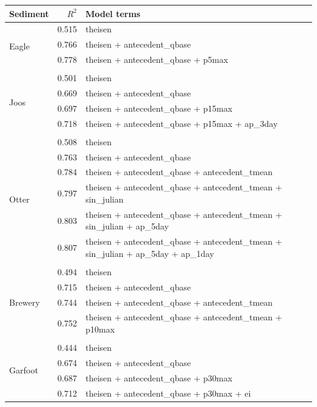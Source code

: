 \documentclass[10pt]{article}
\begin{document}
\begin{table}[h] \small
    \begin{center}
    \begin{tabular}{lrl}
    \textbf{Sediment} & $R^2$ & Model terms \\
    \hline
\multirow{4}{*}{Eagle} & 0.515 & theisen\\ 
 & 0.766 & theisen + antecedent\_qbase\\ 
 & 0.778 & theisen + antecedent\_qbase + p5max\\ 
\vspace{2mm}\\ \multirow{5}{*}{Joos} & 0.501 & theisen\\ 
 & 0.669 & theisen + antecedent\_qbase\\ 
 & 0.697 & theisen + antecedent\_qbase + p15max\\ 
 & 0.718 & theisen + antecedent\_qbase + p15max + ap\_3day\\ 
\vspace{2mm}\\ \multirow{7}{*}{Otter} & 0.508 & theisen\\ 
 & 0.763 & theisen + antecedent\_qbase\\ 
 & 0.784 & theisen + antecedent\_qbase + antecedent\_tmean\\ 
 & 0.797 & theisen + antecedent\_qbase + antecedent\_tmean + sin\_julian\\ 
 & 0.803 & theisen + antecedent\_qbase + antecedent\_tmean + sin\_julian + ap\_5day\\ 
 & 0.807 & theisen + antecedent\_qbase + antecedent\_tmean + sin\_julian + ap\_5day + ap\_1day\\ 
\vspace{2mm}\\ \multirow{5}{*}{Brewery} & 0.494 & theisen\\ 
 & 0.715 & theisen + antecedent\_qbase\\ 
 & 0.744 & theisen + antecedent\_qbase + antecedent\_tmean\\ 
 & 0.752 & theisen + antecedent\_qbase + antecedent\_tmean + p10max\\ 
\vspace{2mm}\\ \multirow{6}{*}{Garfoot} & 0.444 & theisen\\ 
 & 0.674 & theisen + antecedent\_qbase\\ 
 & 0.687 & theisen + antecedent\_qbase + p30max\\ 
 & 0.712 & theisen + antecedent\_qbase + p30max + ei\\ 

\end{tabular}
\end{center}
\end{table}
\end{document}
